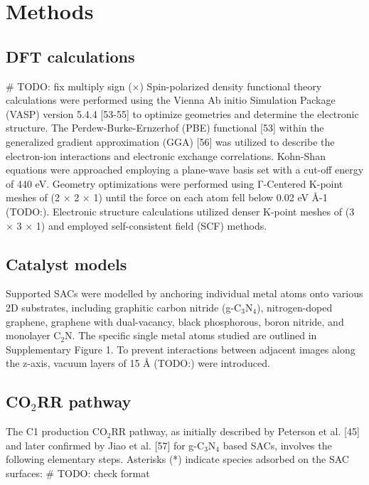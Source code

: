 

\section{Methods}

\subsection{DFT calculations}
# TODO: fix multiply sign (×)
Spin-polarized density functional theory calculations were performed using the Vienna Ab initio Simulation Package (VASP) version 5.4.4 [53-55] to optimize geometries and determine the electronic structure.
The Perdew-Burke-Ernzerhof (PBE) functional [53] within the generalized gradient approximation (GGA) [56] was utilized to describe the electron-ion interactions and electronic exchange correlations.
Kohn-Shan equations were approached employing a plane-wave basis set with a cut-off energy of 440 eV.
Geometry optimizations were performed using Γ-Centered K-point meshes of (2 × 2 × 1) until the force on each atom fell below 0.02 eV Å-1 (TODO:).
Electronic structure calculations utilized denser K-point meshes of (3 × 3 × 1) and employed self-consistent field (SCF) methods.


\subsection{Catalyst models}
Supported SACs were modelled by anchoring individual metal atoms onto various 2D substrates, including graphitic carbon nitride (g-C$_3$N$_4$), nitrogen-doped graphene, graphene with dual-vacancy, black phosphorous, boron nitride, and monolayer C$_2$N.
The specific single metal atoms studied are outlined in Supplementary Figure 1.
To prevent interactions between adjacent images along the z-axis, vacuum layers of 15 Å (TODO:) were introduced.


\subsection{CO$_2$RR pathway}
The C1 production CO$_2$RR pathway, as initially described by Peterson et al. [45] and later confirmed by Jiao et al. [57] for g-C$_3$N$_4$ based SACs, involves the following elementary steps.
Asterisks (*) indicate species adsorbed on the SAC surfaces:
# TODO: check format


